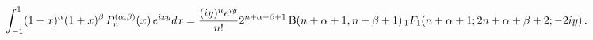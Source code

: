 \[\int_{-1}^{1}(1-x)^{\alpha}(1+x)^{\beta}\mathop{P^{(\alpha,\beta)}_{n}\/}%
\nolimits\!\left(x\right)e^{ixy}dx=\frac{(iy)^{n}e^{iy}}{n!}2^{n+\alpha+\beta+%
1}\mathop{\mathrm{B}\/}\nolimits\!\left(n+\alpha+1,n+\beta+1\right)\mathop{{{}%
_{1}F_{1}}\/}\nolimits\!\left(n+\alpha+1;2n+\alpha+\beta+2;-2iy\right).\]
